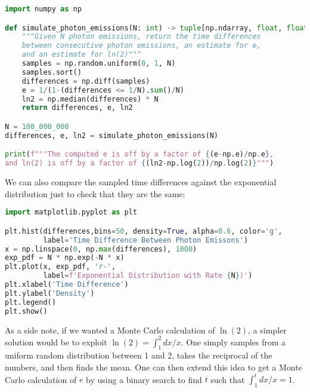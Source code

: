\documentclass[a4paper,12pt]{article}
\begin{document}
\begin{lstlisting}[language=Python]
import numpy as np

def simulate_photon_emissions(N: int) -> tuple[np.ndarray, float, float]:
    """Given N photon emissions, return the time differences
    between consecutive photon emissions, an estimate for e,
    and an estimate for ln(2)"""
    samples = np.random.uniform(0, 1, N)
    samples.sort()
    differences = np.diff(samples)
    e = 1/(1-(differences <= 1/N).sum()/N)
    ln2 = np.median(differences) * N
    return differences, e, ln2

N = 100_000_000
differences, e, ln2 = simulate_photon_emissions(N)

print(f"""The computed e is off by a factor of {(e-np.e)/np.e},
and ln(2) is off by a factor of {(ln2-np.log(2))/np.log(2)}""")
\end{lstlisting}

We can also compare the sampled time differences against the exponential distribution just to check that they are the same:

\begin{lstlisting}[language=Python]
import matplotlib.pyplot as plt

plt.hist(differences,bins=50, density=True, alpha=0.6, color='g',
         label='Time Difference Between Photon Emissons')
x = np.linspace(0, np.max(differences), 1000)
exp_pdf = N * np.exp(-N * x)
plt.plot(x, exp_pdf, 'r-',
         label=f'Exponential Distribution with Rate {N})')
plt.xlabel('Time Difference')
plt.ylabel('Density')
plt.legend()
plt.show()
\end{lstlisting}

As a side note, if we wanted a Monte Carlo calculation of $\ln(2)$, a simpler solution would be to exploit $\ln(2) = \int_1^2{dx/x}$. One simply samples from a uniform random distribution between 1 and 2, takes the reciprocal of the numbers, and then finds the mean. One can then extend this idea to get a Monte Carlo calculation of $e$ by using a binary search to find $t$ such that $\int_1^t{dx/x} = 1$.
\end{document}
